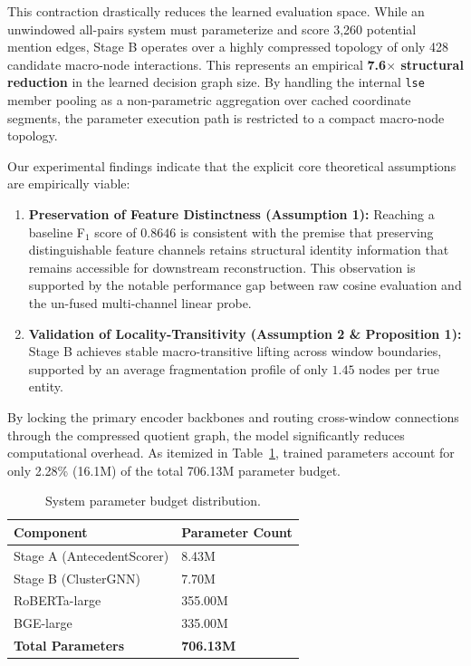 \documentclass[12pt]{article}
\begin{document}
	This contraction drastically reduces the learned evaluation space. While an unwindowed all-pairs system must parameterize and score 3,260 potential mention edges, Stage B operates over a highly compressed topology of only 428 candidate macro-node interactions. This represents an empirical \textbf{7.6$\times$ structural reduction} in the learned decision graph size. By handling the internal \texttt{lse} member pooling as a non-parametric aggregation over cached coordinate segments, the parameter execution path is restricted to a compact macro-node topology.
	
	Our experimental findings indicate that the explicit core theoretical assumptions are empirically viable:
	\begin{enumerate}
		\item \textbf{Preservation of Feature Distinctness (Assumption 1):} Reaching a baseline F$_1$ score of $0.8646$ is consistent with the premise that preserving distinguishable feature channels retains structural identity information that remains accessible for downstream reconstruction. This observation is supported by the notable performance gap between raw cosine evaluation and the un-fused multi-channel linear probe.
		\item \textbf{Validation of Locality-Transitivity (Assumption 2 \& Proposition 1):} Stage B achieves stable macro-transitive lifting across window boundaries, supported by an average fragmentation profile of only $1.45$ nodes per true entity.
	\end{enumerate}
	By locking the primary encoder backbones and routing cross-window connections through the compressed quotient graph, the model significantly reduces computational overhead. As itemized in Table~\ref{tab:parameters}, trained parameters account for only 2.28\% (16.1M) of the total 706.13M parameter budget.
	
	\begin{table}[ht]
		\centering
		\small
		\begin{tabular}{ll}
			\toprule
			\textbf{Component} & \textbf{Parameter Count}\\
			\midrule
			Stage A (AntecedentScorer) & 8.43M   \\
			Stage B (ClusterGNN)       & 7.70M   \\
			RoBERTa-large               & 355.00M \\
			BGE-large                   & 335.00M\\
			\midrule
			\textbf{Total Parameters}   & \textbf{706.13M}\\
			\bottomrule
		\end{tabular}
		\caption{System parameter budget distribution.}
		\label{tab:parameters}
	\end{table}
	
\end{document}
